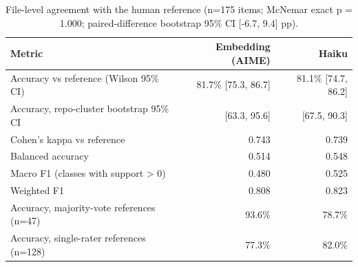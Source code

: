 \begin{table}[t]
\centering
\caption{File-level agreement with the human reference (n=175 items; McNemar exact p = 1.000; paired-difference bootstrap 95\% CI [-6.7, 9.4] pp).}
\label{tab:file-level}
\begin{tabular}{lrr}
\toprule
Metric & Embedding (AIME) & Haiku \\
\midrule
Accuracy vs reference (Wilson 95\% CI) & 81.7\% [75.3, 86.7] & 81.1\% [74.7, 86.2] \\
Accuracy, repo-cluster bootstrap 95\% CI & [63.3, 95.6] & [67.5, 90.3] \\
Cohen's kappa vs reference & 0.743 & 0.739 \\
Balanced accuracy & 0.514 & 0.548 \\
Macro F1 (classes with support > 0) & 0.480 & 0.525 \\
Weighted F1 & 0.808 & 0.823 \\
Accuracy, majority-vote references (n=47) & 93.6\% & 78.7\% \\
Accuracy, single-rater references (n=128) & 77.3\% & 82.0\% \\
\bottomrule
\end{tabular}
\end{table}
